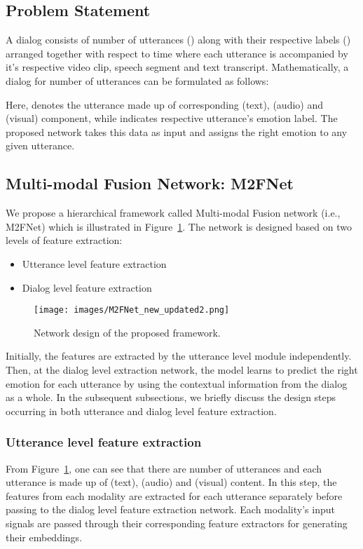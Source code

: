 \documentclass[10pt,twocolumn,letterpaper]{article}
\begin{document}
\subsection{Problem Statement}
A dialog consists of  number of utterances () along with their respective labels () arranged together with respect to time where each utterance is accompanied by it's respective video clip, speech segment and text transcript. Mathematically, a dialog for  number of utterances can be formulated as follows:

Here,  denotes the  utterance made up of corresponding  (text),  (audio) and  (visual) component, while  indicates respective  utterance's emotion label. The proposed network takes this data as input and assigns the right emotion to any given utterance. 

\subsection{Multi-modal Fusion Network: M2FNet}
We propose a hierarchical framework called Multi-modal Fusion network (i.e., M2FNet) which is illustrated in Figure~\ref{fig:network}. The network is designed based on two levels of feature extraction: 
\begin{itemize}
    \item Utterance level feature extraction
    \item Dialog level feature extraction
\end{itemize}
\begin{figure}[t!]
    \centering
    \texttt{[image: images/M2FNet\_new\_updated2.png]}
    \caption{Network design of the proposed framework.}
    \label{fig:network}
\end{figure}
Initially, the features are extracted by the utterance level module independently. Then, at the dialog level extraction network, the model learns to predict the right emotion for each utterance by using the contextual information from the dialog as a whole. In the subsequent subsections, we briefly discuss the design steps occurring in both utterance and dialog level feature extraction. 
\subsubsection{Utterance level feature extraction}
From Figure~\ref{fig:network}, one can see that there are  number of utterances and each utterance is made up of  (text),  (audio) and  (visual) content. In this step, the features from each modality are extracted for each utterance separately before passing to the dialog level feature extraction network. Each modality's input signals are passed through their corresponding feature extractors for generating their embeddings. 
\end{document}
